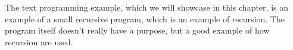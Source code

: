 The text programming example, which we will showcase in this chapter, is an example of a small recursive program, which is an example of recursion. The program itself doesn’t really have a purpose, but a good example of how recursion are used.
\begin{figure}[H]
\centering
{}
\caption{}
\label{ex02}
\end{figure}